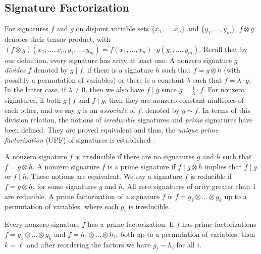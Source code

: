 
\subsection{Signature Factorization}

For signatures $f$ and $g$ on disjoint variable sets $\{x_1,\ldots,x_n\}$ and $\{y_1,\ldots,y_m\}$, $f\otimes g$ denotes their tensor product, with $(f\otimes g)(x_1,\ldots, x_n,y_1,\ldots,y_m)=f(x_1,\ldots,x_n)\cdot g(y_1,\ldots, y_m)$.
Recall that by our definition, every signature has arity at least one.
A nonzero signature $g$ \emph{divides} $f$ denoted by $g \mid f$, if there is a signature $h$ such that  $f=g \otimes h$
(with possibly a permutation of variables) or there is a constant $\lambda$ such that $f= \lambda \cdot g$.
In the latter case, if $\lambda \neq 0$, then we also have $f \mid g$ since $g= \frac{1}{\lambda} \cdot f$.
For nonzero signatures, if both $g\mid f$ and $f \mid g$, then they are nonzero constant multiples of
each other, and 
we say $g$ is an \emph{associate} of $f$, 
denoted by $g \sim f$.
In terms of  this division relation,
the notions of \emph{irreducible}  signatures  and \emph{prime} signatures have been defined.
They are proved equivalent and thus, the \emph{unique prime factorization} (UPF) of signatures is established \cite{cai-fu-shao-eo}.

A nonzero signature $f$ is irreducible  if there are no signatures $g$ and $h$ such that $f=g\otimes h$. 
A nonzero signature $f$ is a prime signature
if $f \mid g\otimes h$
implies that $f \mid g$ or $f \mid h$.  These notions
are equivalent.
We say a signature $f$ is reducible  if $f = g \otimes h$,
for some signatures $g$ and $h$. All zero signatures 
of arity greater than 1 are reducible.
A prime factorization of a signature $f$ is $f=g_1\otimes \ldots \otimes g_k$ up to a permutation of
variables, where each $g_i$ is irreducible. 


\begin{lemma}\label{unique}
Every nonzero signature $f$ has a prime factorization.
If  $f$ has  prime factorizations
 $f=g_1\otimes \ldots \otimes g_k$ and $f=h_1\otimes \ldots \otimes h_\ell$,
both up to a permutation of variables,
then $k=\ell$ and after reordering the factors we have $g_i \sim h_i$  for all $i$. 
\end{lemma}

